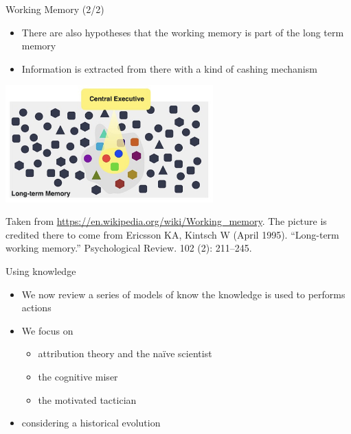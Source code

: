 \documentclass{beamer}
\begin{document}
\begin{frame}
{\centerline{Working Memory (2/2)}}
\begin{itemize}
    \item There are also hypotheses that the working memory is part of the long term memory
    \item Information is extracted from there with a kind of cashing mechanism
\end{itemize} 

\begin{center}

 \includegraphics[width=8cm]{P2023.AIBCCSS.KnowledgeAcquisitionRetentionUse/WorkingMemoryPartOfLongTermMemory.jpg}
 
 \end{center}

\begin{center}
    \tiny{Taken from \url{https://en.wikipedia.org/wiki/Working_memory}. The picture is credited there to come from Ericsson KA, Kintsch W (April 1995). ``Long-term working memory.'' Psychological Review. 102 (2): 211–245. }
\end{center}

\end{frame}



\begin{frame}
{\centerline{Using knowledge}}
\begin{itemize}
    \item We now review a series of models of know the knowledge is used to performs actions
    \item We focus on
    \begin{itemize}
        \item attribution theory and the na\"{i}ve scientist
        \item the cognitive miser 
        \item the motivated tactician
    \end{itemize}
    \item considering a historical evolution
\end{itemize} 
\end{frame}
\end{document}

